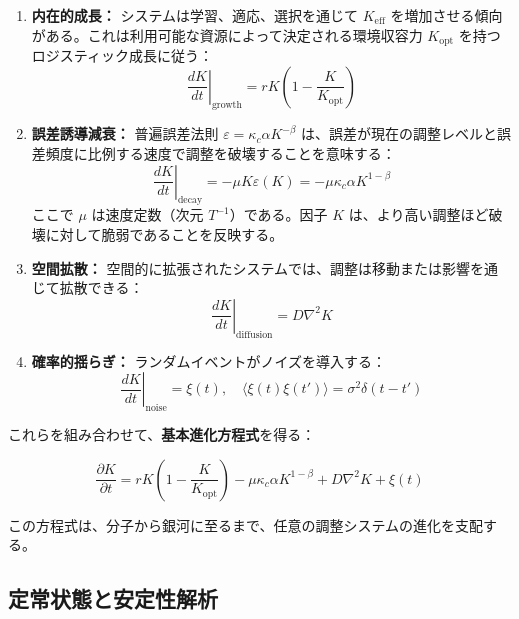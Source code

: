\documentclass[12pt,a4paper]{article}
\newcommand{\Keff}{K_{\mathrm{eff}}}
\newcommand{\Keffopt}{K_{\mathrm{opt}}}
\newcommand{\kappac}{\kappa_c}
\newcommand{\eps}{\varepsilon}
\theoremstyle{remark}
\begin{document}
	\begin{enumerate}
		\item \textbf{内在的成長：} システムは学習、適応、選択を通じて \(\Keff\) を増加させる傾向がある。これは利用可能な資源によって決定される環境収容力 \(\Keffopt\) を持つロジスティック成長に従う：
		\begin{equation}
			\left.\frac{dK}{dt}\right|_{\text{growth}} = r K \left(1 - \frac{K}{\Keffopt}\right)
			\label{eq:growth}
		\end{equation}
		
		\item \textbf{誤差誘導減衰：} 普遍誤差法則 \(\eps = \kappac \alpha K^{-\beta}\) は、誤差が現在の調整レベルと誤差頻度に比例する速度で調整を破壊することを意味する：
		\begin{equation}
			\left.\frac{dK}{dt}\right|_{\text{decay}} = -\mu K \eps(K) = -\mu \kappac \alpha K^{1-\beta}
			\label{eq:decay}
		\end{equation}
		ここで \(\mu\) は速度定数（次元 \(T^{-1}\)）である。因子 \(K\) は、より高い調整ほど破壊に対して脆弱であることを反映する。
		
		\item \textbf{空間拡散：} 空間的に拡張されたシステムでは、調整は移動または影響を通じて拡散できる：
		\begin{equation}
			\left.\frac{dK}{dt}\right|_{\text{diffusion}} = D \nabla^2 K
			\label{eq:diffusion}
		\end{equation}
		
		\item \textbf{確率的揺らぎ：} ランダムイベントがノイズを導入する：
		\begin{equation}
			\left.\frac{dK}{dt}\right|_{\text{noise}} = \xi(t), \quad \langle \xi(t)\xi(t')\rangle = \sigma^2 \delta(t-t')
			\label{eq:noise}
		\end{equation}
	\end{enumerate}
	
	これらを組み合わせて、\textbf{基本進化方程式}を得る：
	
	\begin{equation}
		\boxed{\frac{\partial K}{\partial t} = r K \left(1 - \frac{K}{\Keffopt}\right) - \mu \kappac \alpha K^{1-\beta} + D \nabla^2 K + \xi(t)}
		\label{eq:evolution}
	\end{equation}
	
	この方程式は、分子から銀河に至るまで、任意の調整システムの進化を支配する。
	
	\subsection{定常状態と安定性解析}
	
\end{document}

